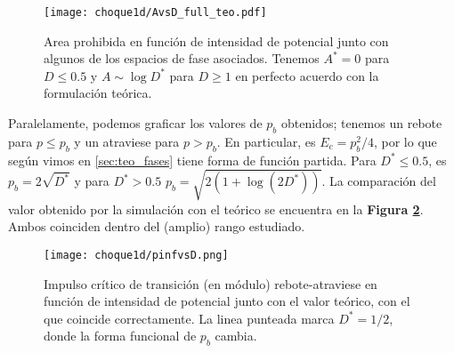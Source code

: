 \begin{figure}[H]
	\centering
	\texttt{[image: choque1d/AvsD\_full\_teo.pdf]}
	\caption{Area prohibida en función de intensidad de potencial junto con algunos de los espacios de fase asociados. 
	Tenemos $A^*=0$ para $D\leq 0.5$ y $A\sim \log{D^*}$ para $D\geq 1$ en perfecto acuerdo con la formulación teórica.}
	\label{fig:AvsD}
\end{figure}

Paralelamente, podemos graficar los valores de $p_b$ obtenidos; tenemos un rebote para $p\leq p_b$ y un atraviese para $p>p_b$.
En particular, es $E_c = p_b^2/4$, por lo que según vimos en \ref{sec:teo_fases} tiene forma de función partida.
Para $D^*\leq 0.5$, es $p_b=2\sqrt{D^*}$ y para $D^*>0.5$ $p_b=\sqrt{2(1+\log(2D^*))}$.
La comparación del valor obtenido por la simulación con el teórico se encuentra en la \textbf{Figura \ref{fig:pbvsD}}.
Ambos coinciden dentro del (amplio) rango estudiado.

\begin{figure}[H]
	\centering
	\texttt{[image: choque1d/pinfvsD.png]}
	\caption{Impulso crítico de transición (en módulo) rebote-atraviese en función de intensidad de potencial junto con el valor teórico, con el que coincide
	correctamente. La linea punteada marca $D^*=1/2$, donde la forma funcional de $p_b$ cambia.}
	\label{fig:pbvsD}
\end{figure}





